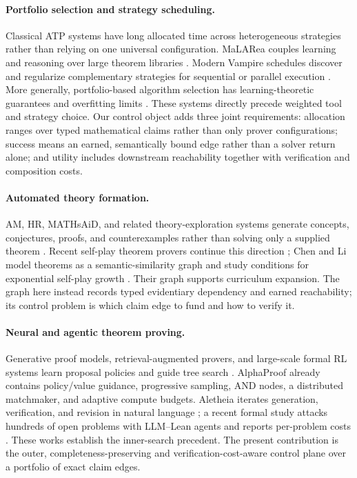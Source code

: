 \documentclass[11pt]{article}
\begin{document}
\paragraph{Portfolio selection and strategy scheduling.}
Classical ATP systems have long allocated time across heterogeneous strategies
rather than relying on one universal configuration.  MaLARea couples learning
and reasoning over large theorem libraries \citep{urban2014malarea}.  Modern
Vampire schedules discover and regularize complementary strategies for
sequential or parallel execution \citep{bartek2024scheduling}.  More generally,
portfolio-based algorithm selection has learning-theoretic guarantees and
overfitting limits \citep{balcan2021portfolio}.  These systems directly
precede weighted tool and strategy choice.  Our control object adds three
joint requirements: allocation ranges over typed mathematical claims rather
than only prover configurations; success means an earned, semantically bound
edge rather than a solver return alone; and utility includes downstream
reachability together with verification and composition costs.

\paragraph{Automated theory formation.}
AM, HR, MATHsAiD, and related theory-exploration systems generate concepts,
conjectures, proofs, and counterexamples rather than solving only a supplied
theorem \citep{lenat1976,colton2002,mccasland2017}.  Recent self-play theorem
provers continue this direction \citep{dong2025stp}; Chen and Li model
theorems as a semantic-similarity graph and study conditions for exponential
self-play growth \citep{chenli2026selfplay}.  Their graph supports curriculum
expansion.  The graph here instead records typed evidentiary dependency and
earned reachability; its control problem is which claim edge to fund and how
to verify it.

\paragraph{Neural and agentic theorem proving.}
Generative proof models, retrieval-augmented provers, and large-scale formal
RL systems learn proposal policies and guide tree search
\citep{polu2020,yang2023leandojo,hubert2025alphaproof}.  AlphaProof already
contains policy/value guidance, progressive sampling, AND nodes, a distributed
matchmaker, and adaptive compute budgets.  Aletheia iterates generation,
verification, and revision in natural language \citep{feng2026aletheia}; a
recent formal study attacks hundreds of open problems with LLM--Lean agents
and reports per-problem costs \citep{tsoukalas2026formalresearch}.  These works
establish the inner-search precedent.  The present contribution is the outer,
completeness-preserving and verification-cost-aware control plane over a
portfolio of exact claim edges.
\end{document}
